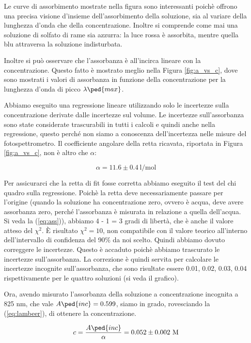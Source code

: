 Le curve di assorbimento mostrate nella figura sono interessanti poichè offrono una precisa visione d'insieme dell'assorbimento
della soluzione, sia al variare della lunghezza d'onda che della concentrazione. Inoltre si comprende come mai una soluzione di
solfato di rame sia azzurra: la luce rossa è assorbita, mentre quella blu attraversa la soluzione indisturbata.

Inoltre si può osservare che l'assorbanza è all'incirca lineare con la concentrazione. Questo fatto è mostrato meglio nella Figura \ref{fig:a_vs_c},
dove sono mostrati i valori di assorbanza in funzione della concentrazione per la lunghezza d'onda di picco $\lambda\ped{max}$.

Abbiamo eseguito una regressione lineare utilizzando solo le incertezze sulla concentrazione derivate dalle incertezze sul volume.
Le incertezze sull'assorbanza sono state considerate trascurabili in tutti i calcoli e quindi anche nella regressione, questo perché non
siamo a conoscenza dell'incertezza nelle misure del fotospettrometro.
Il coefficiente angolare della retta ricavata, riportata in Figura \ref{fig:a_vs_c},
non è altro che $\alpha$:

\begin{equation}
    \alpha = 11.6 \pm 0.4 ~ \text{l/mol}
\end{equation}

Per assicurarci che la retta di fit fosse corretta abbiamo eseguito il test del chi quadro sulla regressione. Poichè la retta deve necessariamente
passare per l'origine (quando la soluzione ha concentrazione zero, ovvero è acqua, deve avere assorbanza zero, perché l'assorbanza è misurata in
relazione a quella dell'acqua. Si veda la (\ref{eq:ass})), abbiamo 4 - 1 = 3 gradi di libertà, che è anche il valore atteso del $\chi^2$.
È risultato $\chi^2 = 10$, non compatibile con il valore teorico all'interno dell'intervallo di confidenza del 90\% da noi scelto.
Quindi abbiamo dovuto correggere le incertezze. Questo è accaduto poichè abbiamo trascurato
le incertezze sull'assorbanza. La correzione è quindi servita per calcolare le incertezze incognite sull'assorbanza, che sono risultate essere 0.01, 0.02,
0.03, 0.04 rispettivamente per le quattro soluzioni (si veda il grafico).

Ora, avendo misurato l'assorbanza della soluzione a concentrazione incognita a 825 nm, che vale $A\ped{inc} = 0.599$, siamo in grado, rovesciando la
(\ref{eq:lambeer}), di ottenere la concentrazione.

\begin{equation}
    c = \frac{A\ped{inc}}{\alpha} = 0.052 \pm 0.002 ~ \text{M}
\end{equation}

